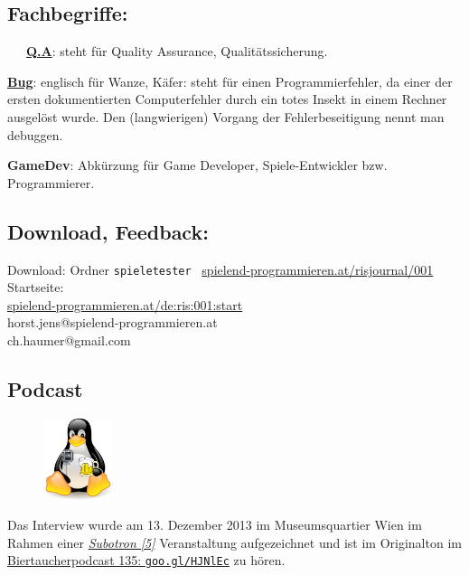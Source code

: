 \documentclass[10pt,a4paper,ngerman,twoside]{article} %
\begin{document}
\begin{multicols}{3}
\subsection*{Fachbegriffe:}
~~~\href{https://de.wikipedia.org/wiki/Quality_Assurance}{\textbf{Q.A}}: steht für Quality Assurance,  Qualitätssicherung.

\href{https://de.wikipedia.org/wiki/Programmfehler}{\textbf{Bug}}: englisch für Wanze, Käfer: steht für einen Programmierfehler, da einer der ersten dokumentierten Computerfehler durch ein totes Insekt in einem Rechner ausgelöst wurde. Den (langwierigen) Vorgang der Fehlerbeseitigung nennt man debuggen.
 
\textbf{GameDev}: Abkürzung für Game Developer, Spiele-Entwickler bzw. Programmierer.

\subsection*{Download, Feedback:}
\footnotesize{
Download: Ordner \texttt{spieletester} \Mundus\ \href{http://spielend-programmieren.at/risjournal/001}{spielend-programmieren.at/risjournal/001}\\
Startseite:\\
\href{http://spielend-programmieren.at/de:ris:001:start}{spielend-programmieren.at/de:ris:001:start}\\ 
\Letter\: horst.jens@spielend-programmieren.at\\
\Letter\: ch.haumer@gmail.com\\}
\normalsize 

\subsection*{Podcast}
\begin{figure}
\includegraphics[width=2cm]{nomad/biertaucherlogo.png}
\end{figure}
Das Interview wurde am 13. Dezember 2013 im Museumsquartier Wien im Rahmen einer \href{http://subotron.com/}{\textit{Subotron [5]}} Veranstaltung aufgezeichnet und ist im Originalton im \href{http://spielend-programmieren.at/de:podcast:biertaucher:2013:135}{Biertaucherpodcast 135: \texttt{goo.gl/HJNlEc}} zu hören.


\end{multicols}
\end{document}
